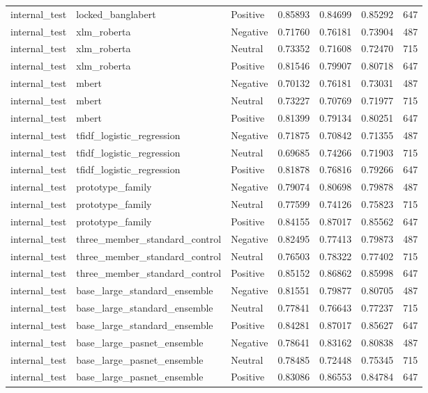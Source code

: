 \begin{tabular}{lllrrrr}
internal\_test & locked\_banglabert & Positive & 0.85893 & 0.84699 & 0.85292 & 647 \\
internal\_test & xlm\_roberta & Negative & 0.71760 & 0.76181 & 0.73904 & 487 \\
internal\_test & xlm\_roberta & Neutral & 0.73352 & 0.71608 & 0.72470 & 715 \\
internal\_test & xlm\_roberta & Positive & 0.81546 & 0.79907 & 0.80718 & 647 \\
internal\_test & mbert & Negative & 0.70132 & 0.76181 & 0.73031 & 487 \\
internal\_test & mbert & Neutral & 0.73227 & 0.70769 & 0.71977 & 715 \\
internal\_test & mbert & Positive & 0.81399 & 0.79134 & 0.80251 & 647 \\
internal\_test & tfidf\_logistic\_regression & Negative & 0.71875 & 0.70842 & 0.71355 & 487 \\
internal\_test & tfidf\_logistic\_regression & Neutral & 0.69685 & 0.74266 & 0.71903 & 715 \\
internal\_test & tfidf\_logistic\_regression & Positive & 0.81878 & 0.76816 & 0.79266 & 647 \\
internal\_test & prototype\_family & Negative & 0.79074 & 0.80698 & 0.79878 & 487 \\
internal\_test & prototype\_family & Neutral & 0.77599 & 0.74126 & 0.75823 & 715 \\
internal\_test & prototype\_family & Positive & 0.84155 & 0.87017 & 0.85562 & 647 \\
internal\_test & three\_member\_standard\_control & Negative & 0.82495 & 0.77413 & 0.79873 & 487 \\
internal\_test & three\_member\_standard\_control & Neutral & 0.76503 & 0.78322 & 0.77402 & 715 \\
internal\_test & three\_member\_standard\_control & Positive & 0.85152 & 0.86862 & 0.85998 & 647 \\
internal\_test & base\_large\_standard\_ensemble & Negative & 0.81551 & 0.79877 & 0.80705 & 487 \\
internal\_test & base\_large\_standard\_ensemble & Neutral & 0.77841 & 0.76643 & 0.77237 & 715 \\
internal\_test & base\_large\_standard\_ensemble & Positive & 0.84281 & 0.87017 & 0.85627 & 647 \\
internal\_test & base\_large\_pasnet\_ensemble & Negative & 0.78641 & 0.83162 & 0.80838 & 487 \\
internal\_test & base\_large\_pasnet\_ensemble & Neutral & 0.78485 & 0.72448 & 0.75345 & 715 \\
internal\_test & base\_large\_pasnet\_ensemble & Positive & 0.83086 & 0.86553 & 0.84784 & 647 \\
\bottomrule
\end{tabular}
